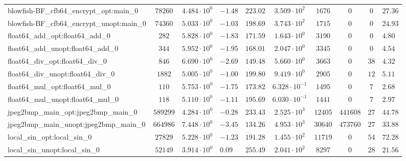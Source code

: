 \begin{tabular}{|l|c|HHc|c|c|c|cH|}
blowfish-BF\_cfb64\_encrypt\_opt:main\_0        & $ 78260    $ & $ 4.484 \cdot 10^{0} $ & $ -1.48 $ & $ 223.02 $ & $ 3.509 \cdot 10^{2}  $ & $ 1676   $ & $ 0       $ & $ 0   $ & $ 27.36   $ \\
blowfish-BF\_cfb64\_encrypt\_unopt:main\_0      & $ 74360    $ & $ 5.033 \cdot 10^{0} $ & $ -1.03 $ & $ 198.69 $ & $ 3.743 \cdot 10^{2}  $ & $ 1715   $ & $ 0       $ & $ 0   $ & $ 24.93   $ \\
float64\_add\_opt:float64\_add\_0               & $ 282      $ & $ 5.828 \cdot 10^{0} $ & $ -1.83 $ & $ 171.59 $ & $ 1.643 \cdot 10^{0}  $ & $ 3190   $ & $ 0       $ & $ 0   $ & $ 4.80    $ \\
float64\_add\_unopt:float64\_add\_0             & $ 344      $ & $ 5.952 \cdot 10^{0} $ & $ -1.95 $ & $ 168.01 $ & $ 2.047 \cdot 10^{0}  $ & $ 3345   $ & $ 0       $ & $ 0   $ & $ 4.54    $ \\
float64\_div\_opt:float64\_div\_0               & $ 846      $ & $ 6.690 \cdot 10^{0} $ & $ -2.69 $ & $ 149.48 $ & $ 5.660 \cdot 10^{0}  $ & $ 3663   $ & $ 0       $ & $ 38  $ & $ 4.32    $ \\
float64\_div\_unopt:float64\_div\_0             & $ 1882     $ & $ 5.005 \cdot 10^{0} $ & $ -1.00 $ & $ 199.80 $ & $ 9.419 \cdot 10^{0}  $ & $ 2905   $ & $ 0       $ & $ 12  $ & $ 5.11    $ \\
float64\_mul\_opt:float64\_mul\_0               & $ 110      $ & $ 5.753 \cdot 10^{0} $ & $ -1.75 $ & $ 173.82 $ & $ 6.328 \cdot 10^{-1} $ & $ 1495   $ & $ 0       $ & $ 7   $ & $ 2.68    $ \\
float64\_mul\_unopt:float64\_mul\_0             & $ 118      $ & $ 5.110 \cdot 10^{0} $ & $ -1.11 $ & $ 195.69 $ & $ 6.030 \cdot 10^{-1} $ & $ 1441   $ & $ 0       $ & $ 7   $ & $ 2.97    $ \\
jpeg2bmp\_main\_opt:jpeg2bmp\_main\_0           & $ 589299   $ & $ 4.284 \cdot 10^{0} $ & $ -0.28 $ & $ 233.43 $ & $ 2.525 \cdot 10^{3}  $ & $ 12405  $ & $ 441608  $ & $ 27  $ & $ 44.78   $ \\
jpeg2bmp\_main\_unopt:jpeg2bmp\_main\_0         & $ 664986   $ & $ 7.448 \cdot 10^{0} $ & $ -3.45 $ & $ 134.26 $ & $ 4.953 \cdot 10^{3}  $ & $ 30640  $ & $ 473760  $ & $ 27  $ & $ 33.88   $ \\
local\_sin\_opt:local\_sin\_0                   & $ 27829    $ & $ 5.228 \cdot 10^{0} $ & $ -1.23 $ & $ 191.28 $ & $ 1.455 \cdot 10^{2}  $ & $ 11719  $ & $ 0       $ & $ 54  $ & $ 72.28   $ \\
local\_sin\_unopt:local\_sin\_0                 & $ 52149    $ & $ 3.914 \cdot 10^{0} $ & $ 0.09  $ & $ 255.49 $ & $ 2.041 \cdot 10^{2}  $ & $ 8297   $ & $ 0       $ & $ 28  $ & $ 21.56   $ \\

\end{tabular}
